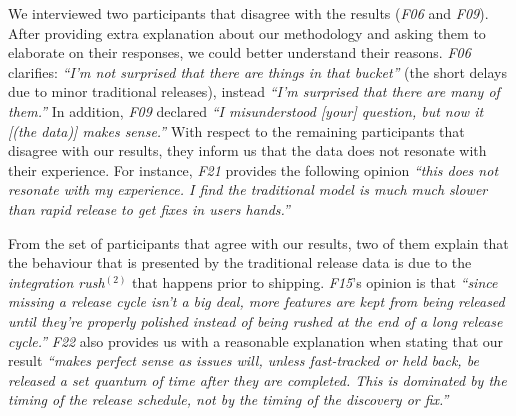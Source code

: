 We interviewed two participants that disagree with the results ({\em F06} and
{\em F09}). After providing extra explanation about our methodology and asking
them to elaborate on their responses, we could better understand their reasons.
{\em F06} clarifies: {\em ``I'm not surprised that there are things in that
bucket''} (the short delays due to minor traditional releases), instead 
{\em ``I'm surprised that there are many of them.''} In addition, {\em F09} declared
{\em ``I misunderstood [your] question, but now it [(the data)] makes
sense.''} With respect to the remaining participants that disagree with our
results, they inform us that the data does not resonate with their experience. For
instance, {\em F21} provides the following opinion {\em ``this does not resonate
with my experience. I find the traditional model is much much slower than rapid
release to get fixes in users hands.''} 

From the set of participants that agree with our results, two of them explain
that the behaviour that is presented by the traditional release data is due to
the {\em integration rush}$^{(2)}$ that happens prior to shipping. {\em F15}'s
opinion is that {\em ``since missing a release cycle isn't a big deal, more
features are kept from being released until they're properly polished instead of
being rushed at the end of a long release cycle.''} {\em F22} also provides us
with a reasonable explanation when stating that our result {\em ``makes perfect
	sense as issues will, unless fast-tracked or held back, be released a
	set quantum of time after they are completed. This is dominated by the
	timing of the release schedule, not by the timing of the discovery or
fix.''}\\


